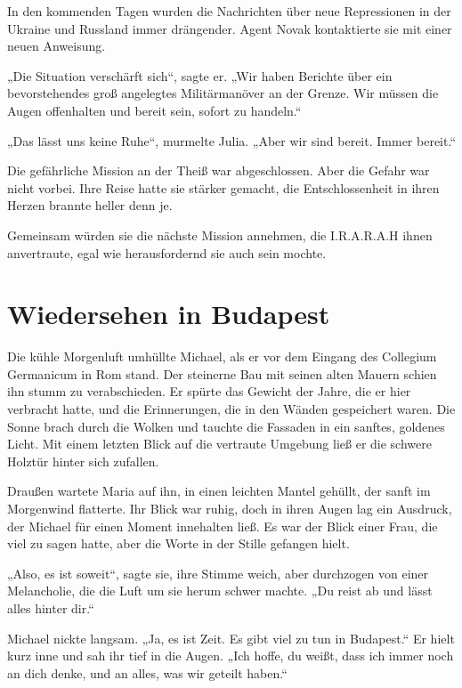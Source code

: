 \documentclass[
]{article}
\begin{document}
In den kommenden Tagen wurden die Nachrichten über neue Repressionen in der Ukraine und Russland immer drängender. Agent Novak kontaktierte sie mit einer neuen Anweisung.

„Die Situation verschärft sich``, sagte er. „Wir haben Berichte über ein bevorstehendes groß angelegtes Militärmanöver an der Grenze. Wir müssen die Augen offenhalten und bereit sein, sofort zu handeln.``

„Das lässt uns keine Ruhe``, murmelte Julia. „Aber wir sind bereit. Immer bereit.``

Die gefährliche Mission an der Theiß war abgeschlossen. Aber die Gefahr war nicht vorbei. Ihre Reise hatte sie stärker gemacht, die Entschlossenheit in ihren Herzen brannte heller denn je.

Gemeinsam würden sie die nächste Mission annehmen, die I.R.A.R.A.H ihnen anvertraute, egal wie herausfordernd sie auch sein mochte.

\section{Wiedersehen in Budapest}\label{wiedersehen-in-budapest}

Die kühle Morgenluft umhüllte Michael, als er vor dem Eingang des Collegium Germanicum in Rom stand. Der steinerne Bau mit seinen alten Mauern schien ihn stumm zu verabschieden. Er spürte das Gewicht der Jahre, die er hier verbracht hatte, und die Erinnerungen, die in den Wänden gespeichert waren. Die Sonne brach durch die Wolken und tauchte die Fassaden in ein sanftes, goldenes Licht. Mit einem letzten Blick auf die vertraute Umgebung ließ er die schwere Holztür hinter sich zufallen.

Draußen wartete Maria auf ihn, in einen leichten Mantel gehüllt, der sanft im Morgenwind flatterte. Ihr Blick war ruhig, doch in ihren Augen lag ein Ausdruck, der Michael für einen Moment innehalten ließ. Es war der Blick einer Frau, die viel zu sagen hatte, aber die Worte in der Stille gefangen hielt.

„Also, es ist soweit``, sagte sie, ihre Stimme weich, aber durchzogen von einer Melancholie, die die Luft um sie herum schwer machte. „Du reist ab und lässt alles hinter dir.``

Michael nickte langsam. „Ja, es ist Zeit. Es gibt viel zu tun in Budapest.`` Er hielt kurz inne und sah ihr tief in die Augen. „Ich hoffe, du weißt, dass ich immer noch an dich denke, und an alles, was wir geteilt haben.``
\end{document}
